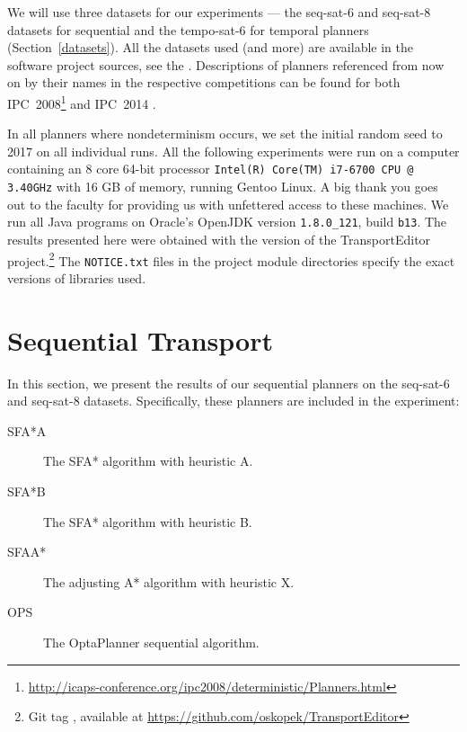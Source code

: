 We will use three datasets for our experiments --- the seq-sat-6
and seq-sat-8 datasets for sequential
and the tempo-sat-6 for temporal planners (Section~\ref{datasets}).
All the datasets used (and more) are available in the
software project sources, see the .
Descriptions of planners referenced from now on by their names in the respective competitions can be found for both IPC~2008\footnote{\url{http://icaps-conference.org/ipc2008/deterministic/Planners.html}} and IPC~2014 \citep{Vallati2015}.

In all planners where nondeterminism occurs,
we set the initial random seed to 2017
on all individual runs.
All the following experiments
were run on a computer
containing an 8 core 64-bit processor \texttt{Intel(R) Core(TM) i7-6700 CPU @ 3.40GHz}
with 16 GB of memory, running Gentoo Linux.
A big thank you goes out to the faculty for providing us with unfettered access to these machines.
We run all Java programs on Oracle's OpenJDK 
version \texttt{1.8.0\_121}, build \texttt{b13}.
The results presented here were obtained with the \TEver{} version of the TransportEditor project.\footnote{Git tag \TEtag{}, available at \url{https://github.com/oskopek/TransportEditor}} The \texttt{NOTICE.txt} files
in the project module directories specify
the exact versions of libraries used.



















\section{Sequential Transport}

In this section, we present the results of our sequential planners on the seq-sat-6 and seq-sat-8 datasets. Specifically, these planners are included in the experiment:
\begin{description}
\item[SFA*A] The SFA* algorithm with heuristic A. 
\item[SFA*B] The SFA* algorithm with heuristic B. 
\item[SFAA*] The adjusting A* algorithm with heuristic X. 
\item[OPS] The OptaPlanner sequential algorithm. 
\end{description}

